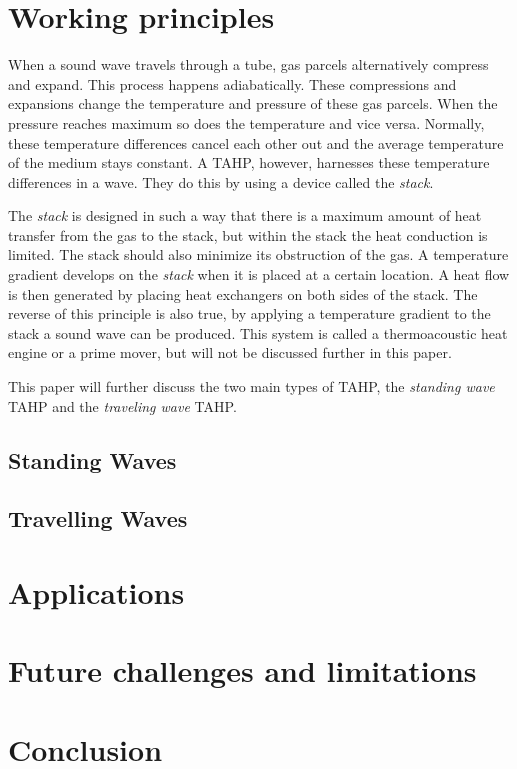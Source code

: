 \documentclass{article}
\newcommand{\newpara}
    {
      \bigbreak{}
      \noindent
    }
\begin{document}
\section{Working principles}
When a sound wave travels through a tube, gas parcels alternatively compress and expand. This process happens adiabatically. These compressions and expansions change the temperature and pressure of these gas parcels. When the pressure reaches maximum so does the temperature and vice versa. Normally, these temperature differences cancel each other out and the average temperature of the medium stays constant. %
A TAHP, however, harnesses these temperature differences in a wave. They do this by using a device called the \emph{stack}. %
\newpara{}
The \emph{stack} is designed in such a way that there is a maximum amount of heat transfer from the gas to the stack, but within the stack the heat conduction is limited. The stack should also minimize its obstruction of the gas. A temperature gradient develops on the \emph{stack} when it is placed at a certain location. A heat flow is then generated by placing heat exchangers on both sides of the stack. The reverse of this principle is also true, by applying a temperature gradient to the stack a sound wave can be produced. This system is called a thermoacoustic heat engine or a prime mover, but will not be discussed further in this paper.%
\newpara{}
This paper will further discuss the two main types of TAHP, the \emph{standing wave} TAHP and the \emph{traveling wave} TAHP.

\subsection{Standing Waves}
\subsection{Travelling Waves}

\section{Applications}

\section{Future challenges and limitations}

\section{Conclusion}
\end{document}
